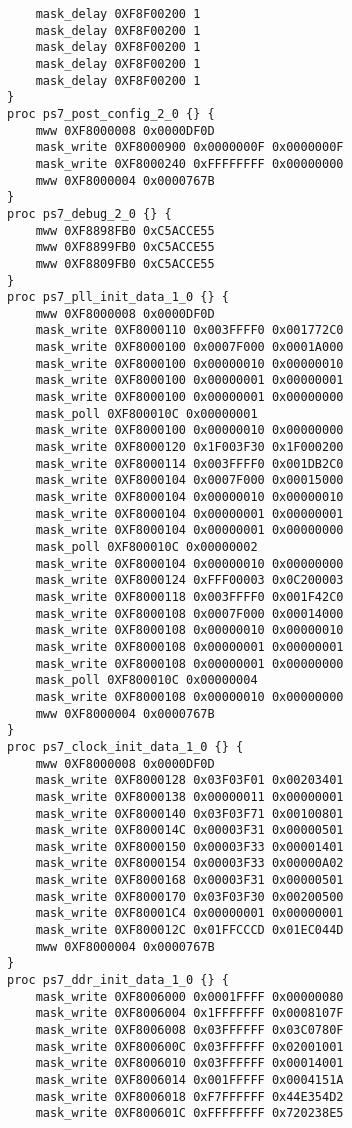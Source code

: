 \begin{lstlisting}
    mask_delay 0XF8F00200 1
    mask_delay 0XF8F00200 1
    mask_delay 0XF8F00200 1
    mask_delay 0XF8F00200 1
    mask_delay 0XF8F00200 1
}
proc ps7_post_config_2_0 {} {
    mww 0XF8000008 0x0000DF0D
    mask_write 0XF8000900 0x0000000F 0x0000000F
    mask_write 0XF8000240 0xFFFFFFFF 0x00000000
    mww 0XF8000004 0x0000767B
}
proc ps7_debug_2_0 {} {
    mww 0XF8898FB0 0xC5ACCE55
    mww 0XF8899FB0 0xC5ACCE55
    mww 0XF8809FB0 0xC5ACCE55
}
proc ps7_pll_init_data_1_0 {} {
    mww 0XF8000008 0x0000DF0D
    mask_write 0XF8000110 0x003FFFF0 0x001772C0
    mask_write 0XF8000100 0x0007F000 0x0001A000
    mask_write 0XF8000100 0x00000010 0x00000010
    mask_write 0XF8000100 0x00000001 0x00000001
    mask_write 0XF8000100 0x00000001 0x00000000
    mask_poll 0XF800010C 0x00000001
    mask_write 0XF8000100 0x00000010 0x00000000
    mask_write 0XF8000120 0x1F003F30 0x1F000200
    mask_write 0XF8000114 0x003FFFF0 0x001DB2C0
    mask_write 0XF8000104 0x0007F000 0x00015000
    mask_write 0XF8000104 0x00000010 0x00000010
    mask_write 0XF8000104 0x00000001 0x00000001
    mask_write 0XF8000104 0x00000001 0x00000000
    mask_poll 0XF800010C 0x00000002
    mask_write 0XF8000104 0x00000010 0x00000000
    mask_write 0XF8000124 0xFFF00003 0x0C200003
    mask_write 0XF8000118 0x003FFFF0 0x001F42C0
    mask_write 0XF8000108 0x0007F000 0x00014000
    mask_write 0XF8000108 0x00000010 0x00000010
    mask_write 0XF8000108 0x00000001 0x00000001
    mask_write 0XF8000108 0x00000001 0x00000000
    mask_poll 0XF800010C 0x00000004
    mask_write 0XF8000108 0x00000010 0x00000000
    mww 0XF8000004 0x0000767B
}
proc ps7_clock_init_data_1_0 {} {
    mww 0XF8000008 0x0000DF0D
    mask_write 0XF8000128 0x03F03F01 0x00203401
    mask_write 0XF8000138 0x00000011 0x00000001
    mask_write 0XF8000140 0x03F03F71 0x00100801
    mask_write 0XF800014C 0x00003F31 0x00000501
    mask_write 0XF8000150 0x00003F33 0x00001401
    mask_write 0XF8000154 0x00003F33 0x00000A02
    mask_write 0XF8000168 0x00003F31 0x00000501
    mask_write 0XF8000170 0x03F03F30 0x00200500
    mask_write 0XF80001C4 0x00000001 0x00000001
    mask_write 0XF800012C 0x01FFCCCD 0x01EC044D
    mww 0XF8000004 0x0000767B
}
proc ps7_ddr_init_data_1_0 {} {
    mask_write 0XF8006000 0x0001FFFF 0x00000080
    mask_write 0XF8006004 0x1FFFFFFF 0x0008107F
    mask_write 0XF8006008 0x03FFFFFF 0x03C0780F
    mask_write 0XF800600C 0x03FFFFFF 0x02001001
    mask_write 0XF8006010 0x03FFFFFF 0x00014001
    mask_write 0XF8006014 0x001FFFFF 0x0004151A
    mask_write 0XF8006018 0xF7FFFFFF 0x44E354D2
    mask_write 0XF800601C 0xFFFFFFFF 0x720238E5

\end{lstlisting}
